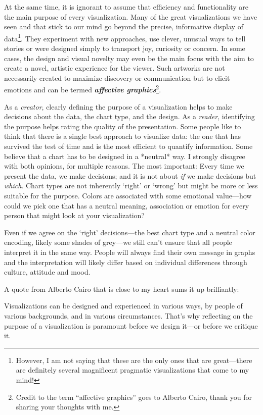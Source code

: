 \documentclass[
]{krantz}
\renewenvironment{quote}{\begin{VF}}{\end{VF}}
\begin{document}
At the same time, it is ignorant to assume that efficiency and functionality are the main purpose of every visualization. Many of the great visualizations we have seen and that stick to our mind go beyond the precise, informative display of data\footnote{However, I am not saying that these are the only ones that are great---there are definitely several magnificent pragmatic visualizations that come to my mind!}. They experiment with new approaches, use clever, unusual ways to tell stories or were designed simply to transport joy, curiosity or concern. In some cases, the design and visual novelty may even be the main focus with the aim to create a novel, artistic experience for the viewer. Such artworks are not necessarily created to maximize discovery or communication but to elicit emotions and can be termed \textbf{\emph{affective graphics}}\footnote{Credit to the term ``affective graphics'' goes to Alberto Cairo, thank you for sharing your thoughts with me.}.

As a \emph{creator}, clearly defining the purpose of a visualization helps to make decisions about the data, the chart type, and the design. As a \emph{reader}, identifying the purpose helps rating the quality of the presentation. Some people like to think that there is a single best approach to visualize data: the one that has survived the test of time and is the most efficient to quantify information. Some believe that a chart has to be designed in a *neutral* way. I strongly disagree with both opinions, for multiple reasons. The most important: Every time we present the data, we make decisions; and it is not about \emph{if} we make decisions but \emph{which}. Chart types are not inherently `right' or `wrong' but might be more or less suitable for the purpose. Colors are associated with some emotional value---how could we pick one that has a neutral meaning, association or emotion for every person that might look at your visualization?

Even if we agree on the `right' decisions---the best chart type and a neutral color encoding, likely some shades of grey---we still can't ensure that all people interpret it in the same way. People will always find their own message in graphs and the interpretation will likely differ based on individual differences through culture, attitude and mood.

A quote from Alberto Cairo that is close to my heart sums it up brilliantly:

\begin{quote}
Visualizations can be designed and experienced in various ways, by people of various backgrounds, and in various circumstances. That's why reflecting on the purpose of a visualization is paramount before we design it---or before we critique it. \citep{cairo2021}
\end{quote}
\end{document}
